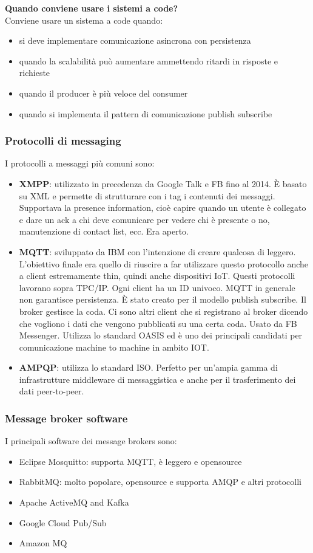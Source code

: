 \textbf{Quando conviene usare i sistemi a code?}\\
Conviene usare un sistema a code quando:
\begin{itemize}
    \item si deve implementare comunicazione asincrona con persistenza
    \item quando la scalabilità può aumentare ammettendo ritardi in risposte e richieste
    \item quando il producer è più veloce del consumer
    \item quando si implementa il pattern di comunicazione publish subscribe
\end{itemize}

\subsubsection{Protocolli di messaging}
I protocolli a messaggi più comuni sono:
\begin{itemize}
    \item \textbf{XMPP}: utilizzato in precedenza da Google Talk e FB fino al 2014. È basato su XML e permette di strutturare con i tag i contenuti dei messaggi. Supportava la presence information, cioè capire quando un utente è collegato e dare un ack a chi deve comunicare per vedere chi è presente o no, manutenzione di contact list, ecc. Era aperto. 
    \item \textbf{MQTT}: sviluppato da IBM con l'intenzione di creare qualcosa di leggero. L'obiettivo finale era quello di riuscire a far utilizzare questo protocollo anche a client estremamente thin, quindi anche dispositivi IoT. Questi protocolli lavorano sopra TPC/IP. Ogni client ha un ID univoco. MQTT in generale non garantisce persistenza. È stato creato per il modello publish subscribe. Il broker gestisce la coda. Ci sono altri client che si registrano al broker dicendo che vogliono i dati che vengono pubblicati su una certa coda. Usato da FB Messenger. Utilizza lo standard OASIS ed è uno dei principali candidati per comunicazione machine to machine in ambito IOT.
    \item \textbf{AMPQP}: utilizza lo standard ISO. Perfetto per un'ampia gamma di infrastrutture middleware di messaggistica e anche
per il trasferimento dei dati peer-to-peer.
\end{itemize}

\subsubsection{Message broker software}
I principali software dei message brokers sono:
\begin{itemize}
    \item Eclipse Mosquitto: supporta MQTT, è leggero e opensource
    \item RabbitMQ: molto popolare, opensource e supporta AMQP e altri protocolli
    \item Apache ActiveMQ and Kafka
    \item Google Cloud Pub/Sub
    \item Amazon MQ
\end{itemize}

